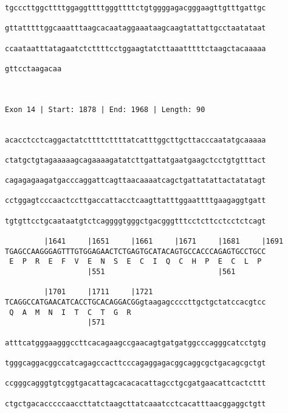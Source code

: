 \documentclass{article}
\begin{document}
\begin{Verbatim}
tgcccttggcttttggaggttttgggttttctgtggggagacgggaagttgtttgattgc
                                                            
gttatttttggcaaatttaagcacaataggaaataagcaagtattattgcctaatataat
                                                            
ccaataatttatagaatctcttttcctggaagtatcttaaatttttctaagctacaaaaa
                                                            
gttcctaagacaa
             
             
 
Exon 14 | Start: 1878 | End: 1968 | Length: 90


acacctcctcaggactatcttttcttttatcatttggcttgcttacccaatatgcaaaaa
                                                            
ctatgctgtagaaaaagcagaaaagatatcttgattatgaatgaagctcctgtgtttact
                                                            
cagagagaagatgacccaggattcagttaacaaaatcagctgattatattactatatagt
                                                            
cctggagtcccaactccttgaccattacctcaagttatttggaattttgaagaggtgatt
                                                            
tgtgttcctgcaataatgtctcaggggtgggctgacgggtttcctcttcctcctctcagt
                                                            
         |1641     |1651     |1661     |1671     |1681     |1691
TGAGCCAAGGGAGTTTGTGGAGAACTCTGAGTGCATACAGTGCCACCCAGAGTGCCTGCC
 E  P  R  E  F  V  E  N  S  E  C  I  Q  C  H  P  E  C  L  P 
                   |551                          |561       
  
         |1701     |1711     |1721                          
TCAGGCCATGAACATCACCTGCACAGGACGGgtaagagccccttgctgctatccacgtcc
 Q  A  M  N  I  T  C  T  G  R                               
                   |571                                     
  
atttcatgggaagggccttcacagaagccgaacagtgatgatggcccagggcatcctgtg
                                                            
tgggcaggacggccatcagagccacttcccagaggagacggcaggcgctgacagcgctgt
                                                            
ccgggcagggtgtcggtgacattagcacacacattagcctgcgatgaacattcactcttt
                                                            
ctgctgacacccccaaccttatctaagcttatcaaatcctcacatttaacggaggctgtt
                                                            

\end{Verbatim}
\end{document}
